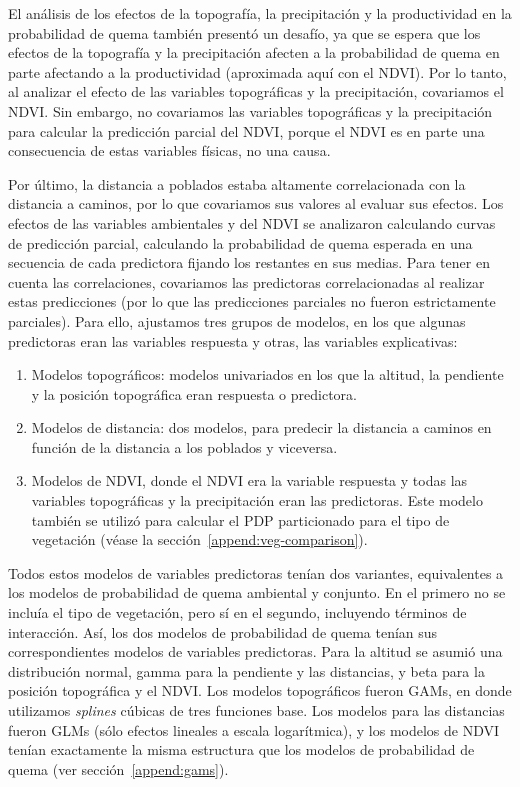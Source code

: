 El análisis de los efectos de la topografía, la precipitación y la productividad en la probabilidad de quema también presentó un desafío, ya que se espera que los efectos de la topografía y la precipitación afecten a la probabilidad de quema en parte afectando a la productividad (aproximada aquí con el NDVI). Por lo tanto, al analizar el efecto de las variables topográficas y la precipitación, covariamos el NDVI. Sin embargo, no covariamos las variables topográficas y la precipitación para calcular la predicción parcial del NDVI, porque el NDVI es en parte una consecuencia de estas variables físicas, no una causa.

Por último, la distancia a poblados estaba altamente correlacionada con la distancia a caminos, por lo que covariamos sus valores al evaluar sus efectos. 
Los efectos de las variables ambientales y del NDVI se analizaron calculando curvas de predicción parcial, calculando la probabilidad de quema esperada en una secuencia de cada predictora fijando los restantes en sus medias. Para tener en cuenta las correlaciones, covariamos las predictoras correlacionadas al realizar estas predicciones (por lo que las predicciones parciales no fueron estrictamente parciales). Para ello, ajustamos tres grupos de modelos, en los que algunas predictoras eran las variables respuesta y otras, las variables explicativas:

\begin{enumerate}
    \item Modelos topográficos: modelos univariados en los que la altitud, la pendiente y la posición topográfica eran respuesta o predictora.
    \item Modelos de distancia: dos modelos, para predecir la distancia a caminos en función de la distancia a los poblados y viceversa.
    \item Modelos de NDVI, donde el NDVI era la variable respuesta y todas las variables topográficas y la precipitación eran las predictoras. Este modelo también se utilizó para calcular el PDP particionado para el tipo de vegetación (véase la sección~\ref{append:veg-comparison}).
\end{enumerate}
    
Todos estos modelos de variables predictoras tenían dos variantes, equivalentes a los modelos de probabilidad de quema ambiental y conjunto. En el primero no se incluía el tipo de vegetación, pero sí en el segundo, incluyendo términos de interacción. Así, los dos modelos de probabilidad de quema tenían sus correspondientes modelos de variables predictoras. Para la altitud se asumió una distribución normal, gamma para la pendiente y las distancias, y beta para la posición topográfica y el NDVI. Los modelos topográficos fueron GAMs, en donde utilizamos \textit{splines} cúbicas de tres funciones base. Los modelos para las distancias fueron GLMs (sólo efectos lineales a escala logarítmica), y los modelos de NDVI tenían exactamente la misma estructura que los modelos de probabilidad de quema (ver sección~\ref{append:gams}).

